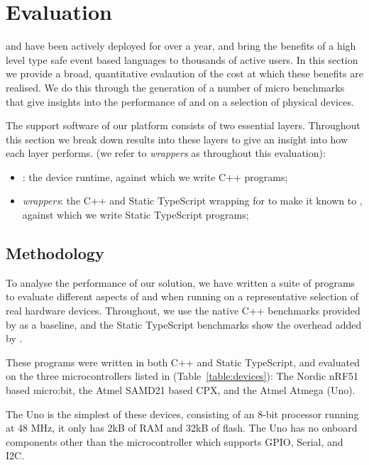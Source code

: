 \section{Evaluation}
\label{sec:evaluate}

\MC and \CO have been actively deployed for over a year, and bring the benefits of a
high level type safe event based languages to thousands of active users.
In this section we provide a broad, quantitative evalaution of the cost at which
these benefits are realised. We do this through the generation of a number of micro
benchmarks that give insights into the performance of \MC and \CO on a selection of
physical devices.

The support software of our platform consists of two essential layers. Throughout this
section we break down results into these layers to give an insight into how each layer performs.
(we refer to \emph{\MC wrappers} as \MC throughout this evaluation):

\begin{itemize}
\item \emph{\CO}: the device runtime, against which we write C++ programs;
\item \emph{\MC wrappers}: the C++ and Static TypeScript wrapping for \CO
to make it known to \MC, against which we write Static TypeScript programs;
\end{itemize}

\subsection{Methodology}

To analyse the performance of our solution, we have written a suite of programs to evaluate
different aspects of \MC and \CO when running on a representative selection of real hardware devices.
Throughout, we use the native C++ benchmarks provided by \CO as a baseline, and the Static TypeScript benchmarks show the overhead
added by \MC.

These programs were written in both C++ and Static TypeScript, and evaluated on the three microcontrollers
listed in (Table~\ref{table:devices}): The Nordic nRF51 based micro:bit, the Atmel SAMD21 based CPX, and the Atmel Atmega (Uno).

The Uno is the simplest of these devices, consisting of an 8-bit processor running at 48 MHz,
it only has 2kB of RAM and 32kB of flash.
The Uno has no onboard components other than the microcontroller which supports
GPIO, Serial, and I2C.

